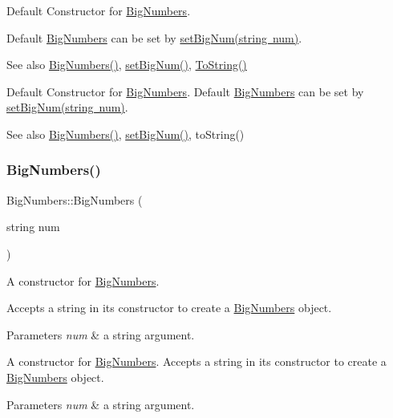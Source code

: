 Default Constructor for \mbox{\hyperlink{class_big_numbers}{Big\+Numbers}}. 

Default \mbox{\hyperlink{class_big_numbers}{Big\+Numbers}} can be set by \mbox{\hyperlink{class_big_numbers_acc7490767828ba1addc49d07a5be3757}{set\+Big\+Num(string num)}}. \begin{DoxySeeAlso}{See also}
\mbox{\hyperlink{class_big_numbers_af3dd82883f10f3473ac83280f26b0ad8}{Big\+Numbers()}}, \mbox{\hyperlink{class_big_numbers_acc7490767828ba1addc49d07a5be3757}{set\+Big\+Num()}}, \mbox{\hyperlink{class_big_numbers_a326c5e36f8b346e85050909536a1a666}{To\+String()}}
\end{DoxySeeAlso}
Default Constructor for \mbox{\hyperlink{class_big_numbers}{Big\+Numbers}}. Default \mbox{\hyperlink{class_big_numbers}{Big\+Numbers}} can be set by \mbox{\hyperlink{class_big_numbers_acc7490767828ba1addc49d07a5be3757}{set\+Big\+Num(string num)}}. \begin{DoxySeeAlso}{See also}
\mbox{\hyperlink{class_big_numbers_af3dd82883f10f3473ac83280f26b0ad8}{Big\+Numbers()}}, \mbox{\hyperlink{class_big_numbers_acc7490767828ba1addc49d07a5be3757}{set\+Big\+Num()}}, to\+String() 
\end{DoxySeeAlso}
\mbox{\label{class_big_numbers_a9052f67b5cdbab8a22310d9133fe1bb5}} 
\subsubsection{\texorpdfstring{Big\+Numbers()}{BigNumbers()}\hspace{0.1cm}{\footnotesize\ttfamily [2/2]}}
{\footnotesize\ttfamily Big\+Numbers\+::\+Big\+Numbers (\begin{DoxyParamCaption}\item[{string}]{num }\end{DoxyParamCaption})}



A constructor for \mbox{\hyperlink{class_big_numbers}{Big\+Numbers}}. 

Accepts a string in its constructor to create a \mbox{\hyperlink{class_big_numbers}{Big\+Numbers}} object. 
\begin{DoxyParams}{Parameters}
{\em num} & a string argument.\\
\hline
\end{DoxyParams}
A constructor for \mbox{\hyperlink{class_big_numbers}{Big\+Numbers}}. Accepts a string in its constructor to create a \mbox{\hyperlink{class_big_numbers}{Big\+Numbers}} object. 
\begin{DoxyParams}{Parameters}
{\em num} & a string argument. \\
\hline
\end{DoxyParams}


